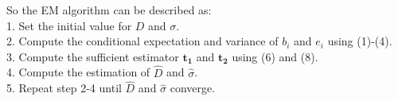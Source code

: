 \documentclass[12pt]{article}
\begin{document}
    So the EM algorithm can be described as:\\
    1. Set the initial value for $D$ and $\sigma$.\\
    2. Compute the conditional expectation and variance of $b_i$ and $e_i$ using (1)-(4).\\
    3. Compute the sufficient estimator $\mathbf{t_1}$ and $\mathbf{t_2}$ using (6) and (8).\\
    4. Compute the estimation of $\hat{D}$ and $\hat{\sigma}$.\\
    5. Repeat step 2-4 until $\hat{D}$ and $\hat{\sigma}$ converge.
    
\end{document}
